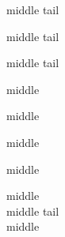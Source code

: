 \documentclass[10pt]{article}
\begin{document}
\hfill middle \hfill tail \hfill\par
\hfill middle \hfill tail \par
\hfill middle \hfill tail \hfill \mbox{}\par
\mbox{} \hfill middle \hfill \mbox{}\par %
\hfill middle \hfill  \par %
\mbox{} \hfill middle \hfill \par                                                %
\hfill middle \hfill \mbox{} \par %
\noindent{} \hfill middle \hfill \mbox{}\\ %
\hfill middle \hfill tail \\  %
middle


\end{document}
